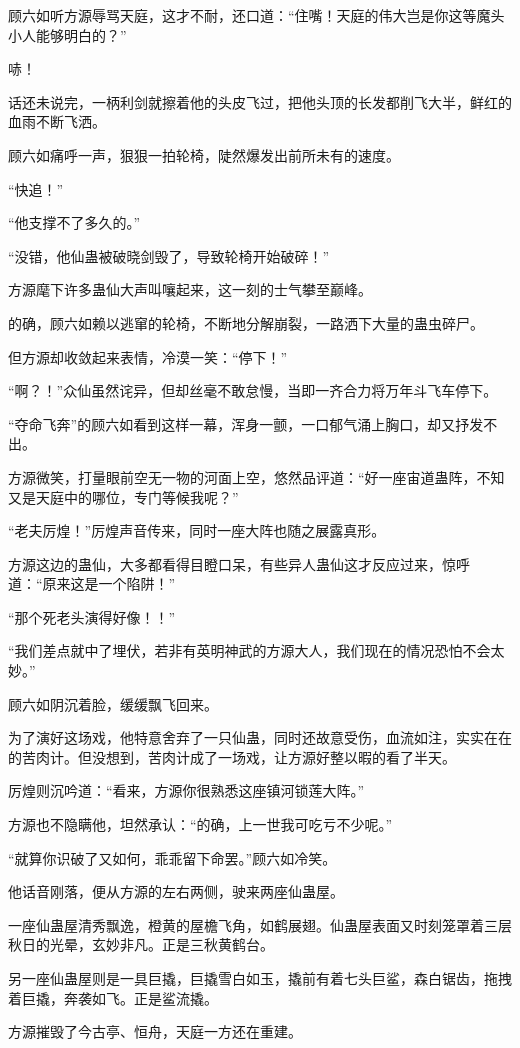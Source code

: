\begin{this_body}
顾六如听方源辱骂天庭，这才不耐，还口道：“住嘴！天庭的伟大岂是你这等魔头小人能够明白的？”

哧！

话还未说完，一柄利剑就擦着他的头皮飞过，把他头顶的长发都削飞大半，鲜红的血雨不断飞洒。

顾六如痛呼一声，狠狠一拍轮椅，陡然爆发出前所未有的速度。

“快追！”

“他支撑不了多久的。”

“没错，他仙蛊被破晓剑毁了，导致轮椅开始破碎！”

方源麾下许多蛊仙大声叫嚷起来，这一刻的士气攀至巅峰。

的确，顾六如赖以逃窜的轮椅，不断地分解崩裂，一路洒下大量的蛊虫碎尸。

但方源却收敛起来表情，冷漠一笑：“停下！”

“啊？！”众仙虽然诧异，但却丝毫不敢怠慢，当即一齐合力将万年斗飞车停下。

“夺命飞奔”的顾六如看到这样一幕，浑身一颤，一口郁气涌上胸口，却又抒发不出。

方源微笑，打量眼前空无一物的河面上空，悠然品评道：“好一座宙道蛊阵，不知又是天庭中的哪位，专门等候我呢？”

“老夫厉煌！”厉煌声音传来，同时一座大阵也随之展露真形。

方源这边的蛊仙，大多都看得目瞪口呆，有些异人蛊仙这才反应过来，惊呼道：“原来这是一个陷阱！”

“那个死老头演得好像！！”

“我们差点就中了埋伏，若非有英明神武的方源大人，我们现在的情况恐怕不会太妙。”

顾六如阴沉着脸，缓缓飘飞回来。

为了演好这场戏，他特意舍弃了一只仙蛊，同时还故意受伤，血流如注，实实在在的苦肉计。但没想到，苦肉计成了一场戏，让方源好整以暇的看了半天。

厉煌则沉吟道：“看来，方源你很熟悉这座镇河锁莲大阵。”

方源也不隐瞒他，坦然承认：“的确，上一世我可吃亏不少呢。”

“就算你识破了又如何，乖乖留下命罢。”顾六如冷笑。

他话音刚落，便从方源的左右两侧，驶来两座仙蛊屋。

一座仙蛊屋清秀飘逸，橙黄的屋檐飞角，如鹤展翅。仙蛊屋表面又时刻笼罩着三层秋日的光晕，玄妙非凡。正是三秋黄鹤台。

另一座仙蛊屋则是一具巨撬，巨撬雪白如玉，撬前有着七头巨鲨，森白锯齿，拖拽着巨撬，奔袭如飞。正是鲨流撬。

方源摧毁了今古亭、恒舟，天庭一方还在重建。


\end{this_body}
